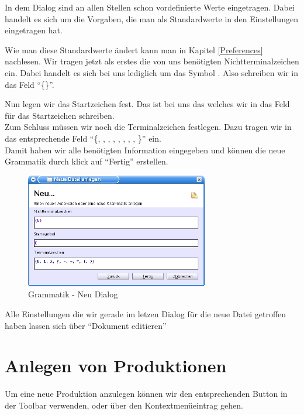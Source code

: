 In dem Dialog sind an allen Stellen schon vordefinierte Werte eingetragen.
Dabei handelt es sich um die Vorgaben, die man als Standardwerte in den
Einstellungen eingetragen hat.

Wie man diese Standardwerte ändert kann man in Kapitel \ref{Preferences}
nachlesen. Wir tragen jetzt als erstes die von uns benötigten
Nichtterminalzeichen ein. Dabei handelt es sich bei uns lediglich um das Symbol
. Also schreiben wir in das Feld
"`\{\}"'.\vspace{10pt}

Nun legen wir das Startzeichen fest. Das ist bei uns das 
welches wir in das Feld für das Startzeichen schreiben.\\
Zum Schluss müssen wir noch die Terminalzeichen festlegen. Dazu tragen
wir in das entsprechende Feld "`\{, ,
, , \TerminalSymbol{-}, \TerminalSymbol{+},
\TerminalSymbol{*}, \TerminalSymbol{(}, \TerminalSymbol{)}\}"' ein.\\ Damit
haben wir alle benötigten Information eingegeben und können die neue Grammatik durch klick auf "`Fertig"' erstellen.\vspace{10pt}

\begin{figure}[h]
\begin{center}
\includegraphics[width=8cm]{images/new_dialog_grammar.png}
\caption{Grammatik - Neu Dialog}
\end{center}
\end{figure}

Alle Einstellungen die wir gerade im letzen Dialog für die neue Datei getroffen
haben lassen sich über "`Dokument editieren"'

\section{Anlegen von Produktionen}

Um eine neue Produktion anzulegen können wir den entsprechenden Button in der
Toolbar verwenden, oder über den Kontextmenüeintrag gehen.\vspace{10pt}

